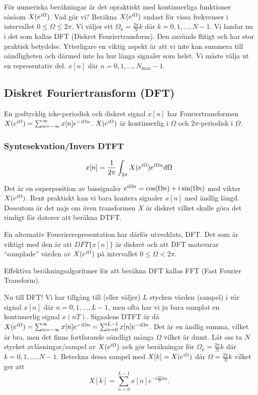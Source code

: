 \documentclass[a4paper]{article}
\begin{document}
För numeriska beräkningar är det opraktiskt med kontinuerliga funktioner
såsåom \(
    X(e^{{i\Omega}})
\). Vad gör vi? Beräkna \(
    X(e^{i\Omega})
\) endast för vissa frekvenser i intervallet \(
    0 \leq \Omega \leq 2\pi
\). Vi väljer ett \(
    \Omega_k = \frac{2\pi}{N} k
\) där \(
    k = 0, 1, \dots, N-1
\). Vi landar nu i det som kallas DFT (Diskret Fouriertransform). Den används
flitigt och har stor praktisk betydelse. Ytterligare en viktig aspekt
är att vi inte kan summera till oändligheten och därmed inte ha hur långa signaler 
som helst. Vi måste välja ut en representativ del. \(
    x[n] 
\) där \(
    n = 0, 1, \dots,N_{\text{max}}-1
\). 

\subsection{Diskret Fouriertransform (DFT)}
En godtycklig icke-periodisk och diskret signal \(
    x[n]
\) har Fouriertransformen \(
    X(e^{i\Omega}) = \sum_{n=-\infty}^\infty x[n] e^{-{i\Omega} n}
\). \(
    X(e^{i\Omega})
\) är kontinuerlig i \(
    \Omega
\) och \(
    2\pi
\)-periodisk i \(
    \Omega
\). 

\subsubsection{Syntesekvation/Invers DTFT}
\[
    x[n] = \frac{1}{2\pi} \int_{2\pi} X(e^{{i\Omega}}) e^{{i\Omega} n} \dd \Omega
\]

Det är en superposition av bassignaler \(
    e^{{i\Omega} n} = \cos(\Omega n) + i \sin(\Omega n)
\) med vikter \(
    X(e^{{i\Omega}})
\). Rent praktiskt kan vi bara hantera signaler \(
    x[n]
\) med ändlig längd. Dessutom är det najs om även transformen \(
    X
\) är diskret vilket skulle göra det rimligt för datorer att beräkna DTFT.

En alternativ Fouerirerepresentation har därför utvecklats, DFT.
Det som är viktigt med den är att \(
    DFT\{ x[n] \}
\) är diskret och att DFT motsvarar \enquote{samplade} värden av \(
    X(e^{i\Omega})
\) på intervallet \(
    0 \leq \Omega < 2\pi
\). 

Effektiva beräkningsalgoritmer för att beräkna DFT kallas FFT 
(Fast Fourier Transform). 

Nu till DFT! Vi har tillgång till (eller väljer) \(
    L
\) stycken värden (sampel) i vår signal \(
    x[n]
\) där \(
    n = 0, 1, \dots, L-1
\), men ofta har vi ju bara samplat en kontinuerlig signal \(
    x(nT)
\). Signalens DTFT är då \(
    X(e^{i\Omega}) = \sum_{n=-\infty}^\infty x[n] e^{-{i\Omega} n}
        = \sum_{n=0}^{L-1} x[n] e^{-{i\Omega} n}
\). Det är en ändlig summa, vilket är bra, men det finns fortfarande 
oändligt många \(
    \Omega
\) vilket är dumt. Låt oss ta \(
    N
\) stycket avläsningar/sampel av \(
    X(e^{i\Omega})
\) och gör beräkningar för \(
    \Omega_k = \frac{2\pi}{N} k
\) där \(
    k = 0, 1, \dots, N-1
\). Beteckna dessa sampel med \(
    X[k] = X(e^{i\Omega}) 
\) där \( 
    \Omega = \frac{2\pi}{N} k 
\) vilket ger att \[
    X[k] 
        = \sum_{n=0}^{L-1} x[n] e^{-i \frac{2\pi}{N} k n}.
\] 
\end{document}
